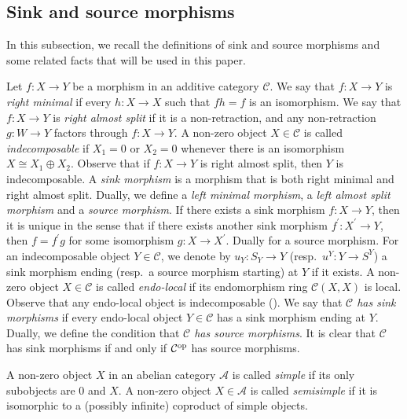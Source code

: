 \documentclass[12pt]{amsart}
\numberwithin{equation}{subsection}
\theoremstyle{plain}
\theoremstyle{definition}
\newcommand{\A}{\mathcal{A}}
\newcommand{\C}{\mathcal{C}}
\newcommand{\op}{{\rm op}}
\begin{document}
\subsection{Sink and source morphisms}
\label{Sink_and_source_morphisms}




In this subsection, we recall the definitions of sink and source morphisms and some related facts that will be used in this paper.




Let $f: X \to Y$ be a morphism in an additive category $\C$.
We say that $f: X \to Y$ is {\it right minimal} if every $h: X \to X$ such that $fh =f$ is an isomorphism.
We say that $f: X \to Y$ is {\it right almost split} if it is a non-retraction, and any non-retraction $g: W \to Y$ factors through $f: X \to Y$.
A non-zero object $X \in \C$ is called {\it indecomposable} if $X_1 =0$ or $X_2 =0$ whenever there is an isomorphism $X \cong X_1 \oplus X_2$.
Observe that if $f: X \to Y$ is right almost split, then $Y$ is indecomposable. 
A {\it sink morphism} is a morphism that is both right minimal and right almost split. 
Dually, we define a {\it left minimal morphism}, a {\it left almost split morphism} and a {\it source morphism}.
If there exists a sink morphism $f:X \to Y$, then it is unique in the sense that if there exists another sink morphism $f^\prime:X^\prime \to Y$, then $f=f^\prime g$ for some isomorphism $g:X \to X^\prime $. Dually for a source morphism.
For an indecomposable object $Y\in\C$, we denote by $u_Y: S_Y \to Y$ (resp.~$u^Y: Y\to S^Y$) a sink morphism ending (resp.~a source morphism starting) at $Y$ if it exists.
A non-zero object $X \in \C$ is called {\it endo-local} if its endomorphism ring $\C(X, X)$ is local. 
Observe that any endo-local object is indecomposable (\cite[Lemma 4.5]{Shah_2023}).
We say that {\it $\C$ has sink morphisms} if every endo-local object $Y\in\C$ has a sink morphism ending at $Y$. 
Dually, we define the condition that {\it $\C$ has source morphisms}.
It is clear that $\C$ has sink morphisms if and only if $\C^\op$ has source morphisms. 






A non-zero object $X$ in an abelian category $\A$ is called {\it simple} if its only subobjects are $0$ and $X$.
A non-zero object $X \in \A$ is called {\it semisimple} if it is isomorphic to a (possibly infinite) coproduct of simple objects.
\end{document}
